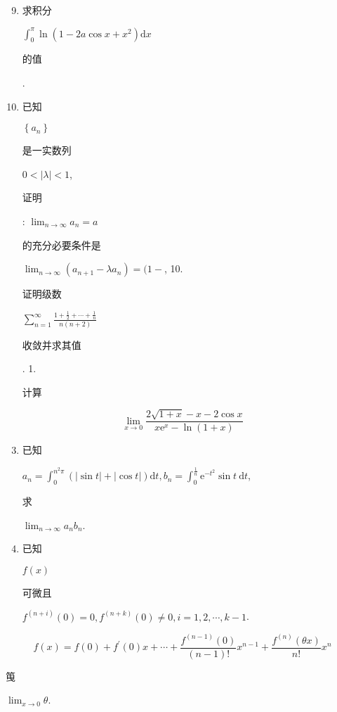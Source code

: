\documentclass[10pt]{article}
\begin{document}
\begin{enumerate}
  \setcounter{enumi}{8}
  \item \begin{CJK}{UTF8}{mj}求积分\end{CJK} $\int_{0}^{\pi} \ln \left(1-2 a \cos x+x^{2}\right) \mathrm{d} x$ \begin{CJK}{UTF8}{mj}的值\end{CJK}.

  \item \begin{CJK}{UTF8}{mj}已知\end{CJK} $\left\{a_{n}\right\}$ \begin{CJK}{UTF8}{mj}是一实数列\end{CJK} $0<|\lambda|<1$, \begin{CJK}{UTF8}{mj}证明\end{CJK}: $\lim _{n \rightarrow \infty} a_{n}=a$ \begin{CJK}{UTF8}{mj}的充分必要条件是\end{CJK} $\lim _{n \rightarrow \infty}\left(a_{n+1}-\lambda a_{n}\right)=(1-$, 10. \begin{CJK}{UTF8}{mj}证明级数\end{CJK} $\sum_{n=1}^{\infty} \frac{1+\frac{1}{2}+\cdots+\frac{1}{n}}{n(n+2)}$ \begin{CJK}{UTF8}{mj}收敛并求其值\end{CJK}. 1.\begin{CJK}{UTF8}{mj}计算\end{CJK}

\end{enumerate}
$$
\lim _{x \rightarrow 0} \frac{2 \sqrt{1+x}-x-2 \cos x}{x \mathrm{e}^{x}-\ln (1+x)}
$$

\begin{enumerate}
  \setcounter{enumi}{2}
  \item \begin{CJK}{UTF8}{mj}已知\end{CJK} $a_{n}=\int_{0}^{n^{2} \pi}(|\sin t|+|\cos t|) \mathrm{d} t, b_{n}=\int_{0}^{\frac{1}{n}} \mathrm{e}^{-t^{2}} \sin t \mathrm{~d} t$, \begin{CJK}{UTF8}{mj}求\end{CJK} $\lim _{n \rightarrow \infty} a_{n} b_{n}$.

  \item \begin{CJK}{UTF8}{mj}已知\end{CJK} $f(x)$ \begin{CJK}{UTF8}{mj}可微且\end{CJK} $f^{(n+i)}(0)=0, f^{(n+k)}(0) \neq 0, i=1,2, \cdots, k-1$.

\end{enumerate}
$$
f(x)=f(0)+f^{\prime}(0) x+\cdots+\frac{f^{(n-1)}(0)}{(n-1) !} x^{n-1}+\frac{f^{(n)}(\theta x)}{n !} x^{n}
$$
\begin{CJK}{UTF8}{mj}䇩\end{CJK} $\lim _{x \rightarrow 0} \theta$.
\end{document}
